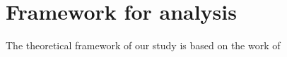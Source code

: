 \section{\noindent \label{sec:Framework}Framework for analysis}

The theoretical framework of our study is based on the work of \cite{null}
  
  
  